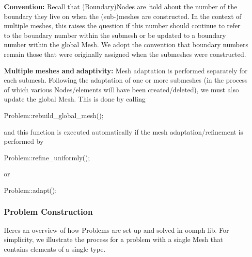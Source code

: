 {\bfseries Convention\+:} Recall that ({\ttfamily Boundary})Nodes are `told\textquotesingle{} about the number of the boundary they live on when the (sub-\/)meshes are constructed. In the context of multiple meshes, this raises the question if this number should continue to refer to the boundary number within the submesh or be updated to a boundary number within the global {\ttfamily Mesh}. We adopt the convention that boundary numbers remain those that were originally assigned when the submeshes were constructed.

{\bfseries Multiple} {\bfseries meshes} {\bfseries and} {\bfseries adaptivity\+:} Mesh adaptation is performed separately for each submesh. Following the adaptation of one or more submeshes (in the process of which various {\ttfamily Nodes/elements} will have been created/deleted), we must also update the global {\ttfamily Mesh}. This is done by calling 
\begin{DoxyCode}
Problem::rebuild\_global\_mesh(); 
\end{DoxyCode}
 and this function is executed automatically if the mesh adaptation/refinement is performed by 
\begin{DoxyCode}
Problem::refine\_uniformly(); 
\end{DoxyCode}
 or 
\begin{DoxyCode}
Problem::adapt(); 
\end{DoxyCode}
\hypertarget{index_prob_setup}{}\subsubsection{Problem Construction}\label{index_prob_setup}
Here\textquotesingle{}s an overview of how {\ttfamily Problems} are set up and solved in {\ttfamily oomph-\/lib}. For simplicity, we illustrate the process for a problem with a single {\ttfamily Mesh} that contains elements of a single type.
